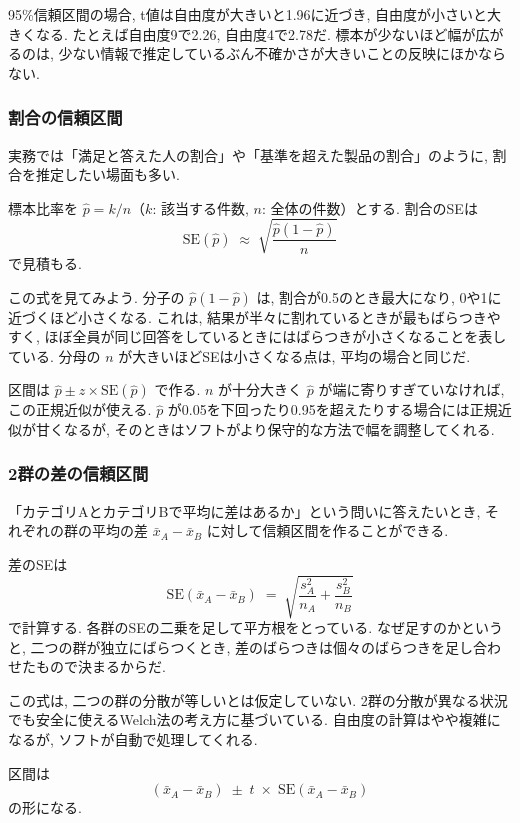 95\%信頼区間の場合, t値は自由度が大きいと1.96に近づき, 自由度が小さいと大きくなる.
たとえば自由度9で2.26, 自由度4で2.78だ.
標本が少ないほど幅が広がるのは, 少ない情報で推定しているぶん不確かさが大きいことの反映にほかならない.

\subsubsection{割合の信頼区間}

実務では「満足と答えた人の割合」や「基準を超えた製品の割合」のように, 割合を推定したい場面も多い.

標本比率を $\hat{p} = k/n$（$k$: 該当する件数, $n$: 全体の件数）とする.
割合のSEは
\[
  \mathrm{SE}(\hat{p}) \;\approx\; \sqrt{\frac{\hat{p}(1-\hat{p})}{n}}
\]
で見積もる.

この式を見てみよう.
分子の $\hat{p}(1-\hat{p})$ は, 割合が0.5のとき最大になり, 0や1に近づくほど小さくなる.
これは, 結果が半々に割れているときが最もばらつきやすく, ほぼ全員が同じ回答をしているときにはばらつきが小さくなることを表している.
分母の $n$ が大きいほどSEは小さくなる点は, 平均の場合と同じだ.

区間は $\hat{p} \pm z \times \mathrm{SE}(\hat{p})$ で作る.
$n$ が十分大きく $\hat{p}$ が端に寄りすぎていなければ, この正規近似が使える.
$\hat{p}$ が0.05を下回ったり0.95を超えたりする場合には正規近似が甘くなるが, そのときはソフトがより保守的な方法で幅を調整してくれる.

\subsubsection{2群の差の信頼区間}

「カテゴリAとカテゴリBで平均に差はあるか」という問いに答えたいとき, それぞれの群の平均の差 $\bar{x}_A - \bar{x}_B$ に対して信頼区間を作ることができる.

差のSEは
\[
  \mathrm{SE}(\bar{x}_A - \bar{x}_B) \;=\; \sqrt{\frac{s_A^2}{n_A} + \frac{s_B^2}{n_B}}
\]
で計算する.
各群のSEの二乗を足して平方根をとっている.
なぜ足すのかというと, 二つの群が独立にばらつくとき, 差のばらつきは個々のばらつきを足し合わせたもので決まるからだ.

この式は, 二つの群の分散が等しいとは仮定していない.
2群の分散が異なる状況でも安全に使えるWelch法の考え方に基づいている.
自由度の計算はやや複雑になるが, ソフトが自動で処理してくれる.

区間は
\[
  (\bar{x}_A - \bar{x}_B) \;\pm\; t \;\times\; \mathrm{SE}(\bar{x}_A - \bar{x}_B)
\]
の形になる.

